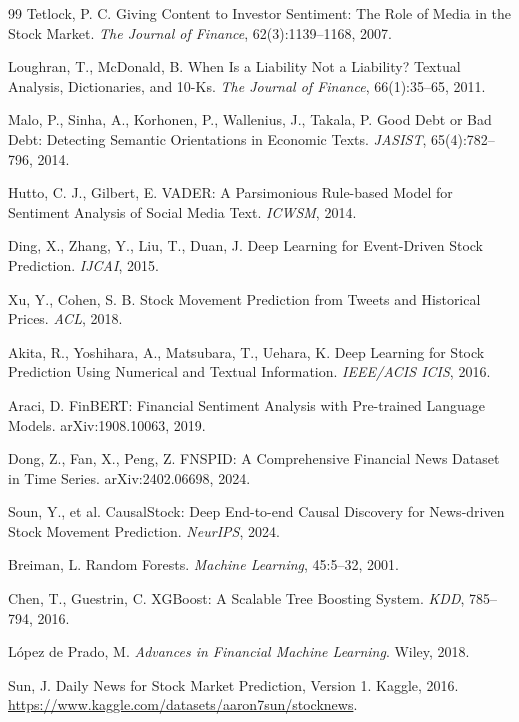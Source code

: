 \documentclass[UTF8,a4paper,9pt,twocolumn,fontset=none]{ctexart}
\begin{document}
\begin{thebibliography}{99}\scriptsize
{}
Tetlock, P. C. Giving Content to Investor Sentiment: The Role of Media in the Stock Market.
\emph{The Journal of Finance}, 62(3):1139--1168, 2007.

Loughran, T., McDonald, B. When Is a Liability Not a Liability? Textual Analysis,
Dictionaries, and 10-Ks. \emph{The Journal of Finance}, 66(1):35--65, 2011.

Malo, P., Sinha, A., Korhonen, P., Wallenius, J., Takala, P.
Good Debt or Bad Debt: Detecting Semantic Orientations in Economic Texts.
\emph{JASIST}, 65(4):782--796, 2014.

Hutto, C. J., Gilbert, E. VADER: A Parsimonious Rule-based Model for Sentiment
Analysis of Social Media Text. \emph{ICWSM}, 2014.

Ding, X., Zhang, Y., Liu, T., Duan, J. Deep Learning for Event-Driven Stock Prediction.
\emph{IJCAI}, 2015.

Xu, Y., Cohen, S. B. Stock Movement Prediction from Tweets and Historical Prices.
\emph{ACL}, 2018.

Akita, R., Yoshihara, A., Matsubara, T., Uehara, K.
Deep Learning for Stock Prediction Using Numerical and Textual Information.
\emph{IEEE/ACIS ICIS}, 2016.

Araci, D. FinBERT: Financial Sentiment Analysis with Pre-trained Language Models.
arXiv:1908.10063, 2019.

Dong, Z., Fan, X., Peng, Z. FNSPID: A Comprehensive Financial News Dataset in Time Series.
arXiv:2402.06698, 2024.

Soun, Y., et al. CausalStock: Deep End-to-end Causal Discovery for News-driven
Stock Movement Prediction. \emph{NeurIPS}, 2024.

Breiman, L. Random Forests. \emph{Machine Learning}, 45:5--32, 2001.

Chen, T., Guestrin, C. XGBoost: A Scalable Tree Boosting System.
\emph{KDD}, 785--794, 2016.

L\'opez de Prado, M. \emph{Advances in Financial Machine Learning}. Wiley, 2018.

Sun, J. Daily News for Stock Market Prediction, Version 1. Kaggle, 2016.
\url{https://www.kaggle.com/datasets/aaron7sun/stocknews}.
\end{thebibliography}
\end{document}
